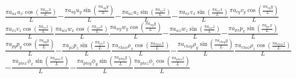 $\frac{\pi a_{ux} u_{x} \operatorname{cos}\left(\frac{\pi a_{ux} x}{L}\right)}{L}$$- \frac{\pi a_{uy} u_{y} \operatorname{sin}\left(\frac{\pi a_{uy} y}{L}\right)}{L}$$- \frac{\pi a_{uz} u_{z} \operatorname{sin}\left(\frac{\pi a_{uz} z}{L}\right)}{L}$$- \frac{\pi a_{vx} v_{x} \operatorname{sin}\left(\frac{\pi a_{vx} x}{L}\right)}{L}$$\frac{\pi a_{vy} v_{y} \operatorname{cos}\left(\frac{\pi a_{vy} y}{L}\right)}{L}$$\frac{\pi a_{vz} v_{z} \operatorname{cos}\left(\frac{\pi a_{vz} z}{L}\right)}{L}$$\frac{\pi a_{wx} w_{x} \operatorname{cos}\left(\frac{\pi a_{wx} x}{L}\right)}{L}$$\frac{\pi a_{wy} w_{y} \operatorname{cos}\left(\frac{\pi a_{wy} y}{L}\right)}{L}$$- \frac{\pi a_{wz} w_{z} \operatorname{sin}\left(\frac{\pi a_{wz} z}{L}\right)}{L}$$- \frac{\pi a_{px} p_{x} \operatorname{sin}\left(\frac{\pi a_{px} x}{L}\right)}{L}$$\frac{\pi a_{py} p_{y} \operatorname{cos}\left(\frac{\pi a_{py} y}{L}\right)}{L}$$- \frac{\pi a_{pz} p_{z} \operatorname{sin}\left(\frac{\pi a_{pz} z}{L}\right)}{L}$$\frac{\pi a_{rhox} \rho_{x} \operatorname{cos}\left(\frac{\pi a_{rhox} x}{L}\right)}{L}$$- \frac{\pi a_{rhoy} \rho_{y} \operatorname{sin}\left(\frac{\pi a_{rhoy} y}{L}\right)}{L}$$\frac{\pi a_{rhoz} \rho_{z} \operatorname{cos}\left(\frac{\pi a_{rhoz} z}{L}\right)}{L}$$- \frac{\pi a_{phix} \phi_{x} \operatorname{sin}\left(\frac{\pi a_{phix} x}{L}\right)}{L}$$- \frac{\pi a_{phiy} \phi_{y} \operatorname{sin}\left(\frac{\pi a_{phiy} y}{L}\right)}{L}$$\frac{\pi a_{phiz} \phi_{z} \operatorname{cos}\left(\frac{\pi a_{phiz} z}{L}\right)}{L}$